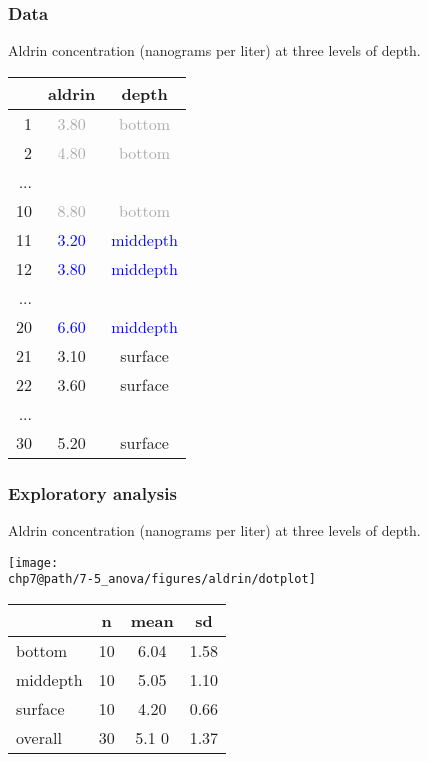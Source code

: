\documentclass[slidestop,compress,mathserif]{beamer}
\makeatletter
\def\chp7@path{../../Chp 7}
\makeatother
\begin{document}
\begin{frame}
\frametitle{Data}

Aldrin concentration (nanograms per liter) at three levels of depth. \\

\begin{center}
\begin{tabular}{r | c | c}
\hline
 	& aldrin 					& depth \\ 
\hline
1 	& \textcolor{darkGray}{3.80} 	& \textcolor{darkGray}{bottom}  \\ 
2 	& \textcolor{darkGray}{4.80} 	& \textcolor{darkGray}{bottom}  \\ 
...	&						& \\
10	& \textcolor{darkGray}{8.80} 	& \textcolor{darkGray}{bottom} \\
11	& \textcolor{blue}{3.20} 		& \textcolor{blue}{middepth}  \\
12	& \textcolor{blue}{3.80} 		& \textcolor{blue}{middepth} \\
...	&						& \\
20 	& \textcolor{blue}{6.60} 		& \textcolor{blue}{middepth} \\
21	& \textcolor{oiB}{3.10} 		& \textcolor{oiB}{surface} \\
22	& \textcolor{oiB}{3.60} 		& \textcolor{oiB}{surface} \\
...	&						& \\
30 	& \textcolor{oiB}{5.20} 		& \textcolor{oiB}{surface} \\  
\hline
\end{tabular}
\end{center}

\end{frame}


\begin{frame}
\frametitle{Exploratory analysis}

Aldrin concentration (nanograms per liter) at three levels of depth. \\

\begin{center}
\texttt{[image: \\chp7@path/7-5\_anova/figures/aldrin/dotplot]}
\end{center}

\begin{center}
\begin{tabular}{l | c c c}
		& n	& mean	& sd		\\
\hline
bottom	& 10	& 6.04	& 1.58 \\
middepth& 10	& 5.05	& 1.10 \\
surface	& 10	& 4.20	& 0.66 \\
\hline
overall	& 30	& 5.1	0	& 1.37
\end{tabular}
\end{center}

\end{frame}
\end{document}
